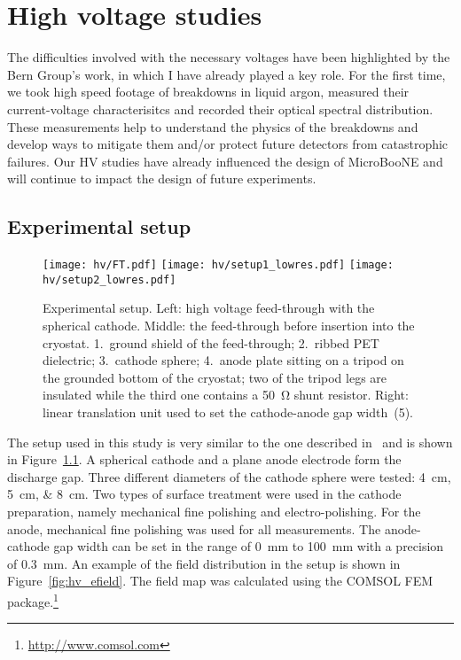 \chapter{High voltage studies\label{chap:hv}}

The difficulties involved with the necessary voltages have been highlighted by the Bern Group’s work, in which I have already played a key role\cite{breakdown_16}.
For the first time, we took high speed footage of breakdowns in liquid argon, measured their current-voltage characterisitcs and recorded their optical spectral distribution.
These measurements help to understand the physics of the breakdowns and develop ways to mitigate them and/or protect future detectors from catastrophic failures.
Our HV studies have already influenced the design of MicroBooNE and will continue to impact the design of future experiments.


\section{Experimental setup\label{sec:hv_setup}}

\begin{figure}[htb]
	\centering	
	\texttt{[image: hv/FT.pdf]}
	\texttt{[image: hv/setup1\_lowres.pdf]}
	\texttt{[image: hv/setup2\_lowres.pdf]}
	\caption{Experimental setup. Left: high voltage feed-through with the spherical cathode. Middle: the feed-through before insertion into the cryostat. 1.~ground shield of the feed-through; 2.~ribbed PET dielectric; 3.~cathode sphere; 4.~anode plate sitting on a tripod on the grounded bottom of the cryostat; two of the tripod legs are insulated while the third one contains a \SI{50}{\ohm} shunt resistor. Right: linear translation unit used to set the cathode-anode gap width~(5).}
	\label{fig:hv_setup1}
\end{figure}

The setup used in this study is very similar to the one described in~\cite{breakdown_14} and is shown in Figure~\ref{fig:hv_setup1}.
A spherical cathode and a plane anode electrode form the discharge gap.
Three different diameters of the cathode sphere were tested: \SIlist{4; 5; 8}{\centi\metre}.
Two types of surface treatment were used in the cathode preparation, namely mechanical fine polishing and electro-polishing.
For the anode, mechanical fine polishing was used for all measurements.
The anode-cathode gap width can be set in the range of \SI{0}{\milli\metre} to \SI{100}{\milli\metre} with a precision of \SI{0.3}{\milli\metre}.
An example of the field distribution in the setup is shown in Figure~\ref{fig:hv_efield}.
The field map was calculated using the COMSOL FEM package.\footnote{\href{http://www.comsol.com}{http://www.comsol.com}}

